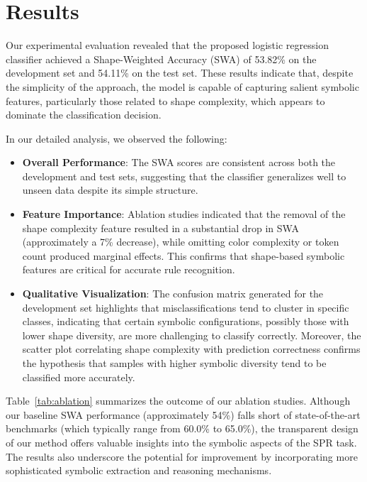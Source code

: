 \documentclass{article}
\begin{document}
\section{Results}
Our experimental evaluation revealed that the proposed logistic regression classifier achieved a Shape-Weighted Accuracy (SWA) of 53.82\% on the development set and 54.11\% on the test set. These results indicate that, despite the simplicity of the approach, the model is capable of capturing salient symbolic features, particularly those related to shape complexity, which appears to dominate the classification decision.

In our detailed analysis, we observed the following:
\begin{itemize}
    \item \textbf{Overall Performance}: The SWA scores are consistent across both the development and test sets, suggesting that the classifier generalizes well to unseen data despite its simple structure.
    \item \textbf{Feature Importance}: Ablation studies indicated that the removal of the shape complexity feature resulted in a substantial drop in SWA (approximately a 7\% decrease), while omitting color complexity or token count produced marginal effects. This confirms that shape-based symbolic features are critical for accurate rule recognition.
    \item \textbf{Qualitative Visualization}: The confusion matrix generated for the development set highlights that misclassifications tend to cluster in specific classes, indicating that certain symbolic configurations, possibly those with lower shape diversity, are more challenging to classify correctly. Moreover, the scatter plot correlating shape complexity with prediction correctness confirms the hypothesis that samples with higher symbolic diversity tend to be classified more accurately.
\end{itemize}

Table~\ref{tab:ablation} summarizes the outcome of our ablation studies. Although our baseline SWA performance (approximately 54\%) falls short of state-of-the-art benchmarks (which typically range from 60.0\% to 65.0\%), the transparent design of our method offers valuable insights into the symbolic aspects of the SPR task. The results also underscore the potential for improvement by incorporating more sophisticated symbolic extraction and reasoning mechanisms.
\end{document}
